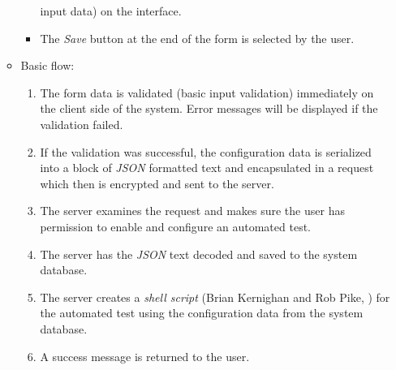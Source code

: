 \begin{enumerate}
\begin{itemize}
\begin{itemize}
                input data) on the
                interface.
            \item The \emph{Save} button at the end of the form is selected by
                the user.
        \end{itemize}
    \item Basic flow:
        \begin{enumerate}
            \item The form data is validated (basic input validation)
                immediately on the client side of the system. Error messages
                will be displayed if the validation failed.
            \item If the validation was successful, the configuration data is
                serialized into a block of \emph{JSON} \cite{JSON} formatted text and
                encapsulated in a request which then is encrypted and sent to
                the server.
            \item The server examines the request and makes sure the user has
                permission to enable and configure an automated test.
            \item The server has the \emph{JSON} text decoded and saved to the
                system database.
            \item The server creates a \emph{shell script} 
                (Brian Kernighan and Rob Pike, \cite{shellScript})
                for the automated test using the configuration data from the
                system database.
            \item A success message is returned to the user.
        \end{enumerate}
\end{itemize}


\end{enumerate}
